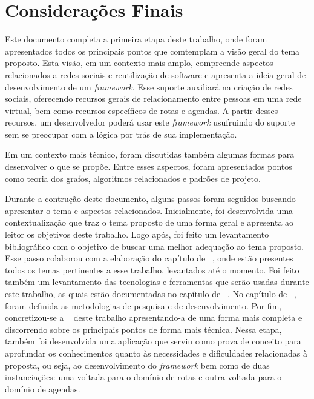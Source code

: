 \chapter{Considerações Finais}
\label{chapter:Consideracoes_Finais}

 Este documento completa a primeira etapa deste trabalho, onde foram apresentados todos os principais pontos que comtemplam a visão geral do tema proposto. Esta visão, em um contexto mais amplo, compreende aspectos relacionados a redes sociais e reutilização de software e apresenta a ideia geral de desenvolvimento de um \textit{framework}. Esse suporte auxiliará na criação de redes sociais, oferecendo recursos gerais de relacionamento entre pessoas em uma rede virtual, bem como recursos específicos de rotas e agendas. A partir desses recursos, um desenvolvedor poderá usar este \textit{framework} usufruindo do suporte sem se preocupar com a lógica por trás de sua implementação.

 Em um contexto mais técnico, foram discutidas também algumas formas para desenvolver o que se propõe. Entre esses aspectos, foram apresentados pontos como teoria dos grafos, algoritmos relacionados e padrões de projeto.

Durante a contrução deste documento, alguns passos foram seguidos buscando apresentar o tema e aspectos relacionados. Inicialmente, foi desenvolvida uma contextualização que traz o tema proposto de uma forma geral e apresenta ao leitor os objetivos deste trabalho. Logo após, foi feito um levantamento bibliográfico com o objetivo de buscar uma melhor adequação ao tema proposto. Esse passo colaborou com a elaboração do capítulo de ~, onde estão presentes todos os temas pertinentes a esse trabalho, levantados até o momento. Foi feito também um levantamento das tecnologias e ferramentas que serão usadas durante este trabalho, as quais estão documentadas no capítulo de ~. No capítulo de ~, foram definida as metodologias de pesquisa e de desenvolvimento. Por fim, concretizou-se a ~ deste trabalho apresentando-a de uma forma mais completa e discorrendo sobre os principais pontos de forma mais técnica. Nessa etapa, também foi desenvolvida uma aplicação que serviu como prova de conceito para aprofundar os conhecimentos quanto às necessidades e dificuldades relacionadas à proposta, ou seja, ao desenvolvimento do \textit{framework} bem como de duas instanciações: uma voltada para o domínio de rotas e outra voltada para o domínio de agendas.


